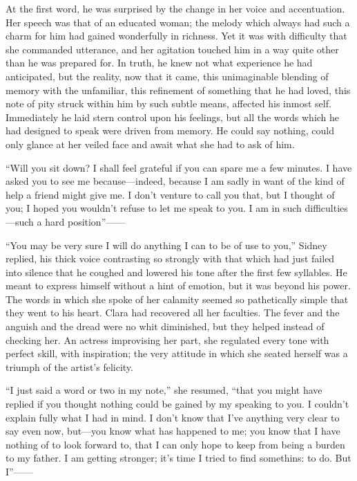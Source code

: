 At the first word, he was surprised by the change in her voice and
accentuation. Her speech was that of an educated woman; the melody which
always had such a charm for him had gained wonderfully in richness. Yet
it was with difficulty that she commanded utterance, and her agitation
touched him in a way quite other than he was prepared for. In {}truth,
he knew not what experience he had anticipated, but the reality, now
that it came, this unimaginable blending of memory with the unfamiliar,
this refinement of something that he had loved, this note of pity struck
within him by such subtle means, affected his inmost self. Immediately
he laid stern control upon his feelings, but all the words which he had
designed to speak were driven from memory. He could say nothing, could
only glance at her veiled face and await what she had to ask of him.

``Will you sit down? I shall feel grateful if you can spare me a few
minutes. I have asked you to see me because---indeed, because I am sadly
in want of the kind of help a friend might give me. I don't venture to
call you that, but I thought of you; I hoped you wouldn't refuse to let
me speak to you. I am in such difficulties---such a hard
position''{{------}}

``You may be very sure I will do anything I can to be of use to you,''
Sidney replied, his thick voice contrasting so strongly with that which
had just failed into silence that he coughed and lowered his tone after
the first few syllables. He meant to express himself {}without a hint of
emotion, but it was beyond his power. The words in which she spoke of
her calamity seemed so pathetically simple that they went to his heart.
Clara had recovered all her faculties. The fever and the anguish and the
dread were no whit diminished, but they helped instead of checking her.
An actress improvising her part, she regulated every tone with perfect
skill, with inspiration; the very attitude in which she seated herself
was a triumph of the artist's felicity.

``I just said a word or two in my note,'' she resumed, ``that you might
have replied if you thought nothing could be gained by my speaking to
you. I couldn't explain fully what I had in mind. I don't know that I've
anything very clear to say even now, but---you know what has happened to
me; you know that I have nothing of to look forward to, that I can only
hope to keep from being a burden to my father. I am getting stronger;
it's time I tried to find somethins: to do. But I''{{------}}


